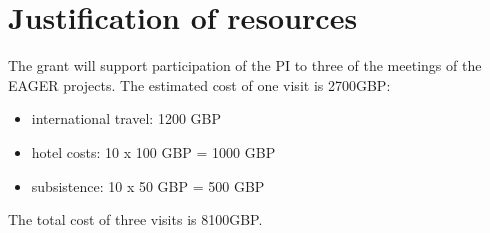 
\section{Justification of resources}
\label{annex:just}

The grant will support participation of the PI to three of the meetings of the EAGER projects.  The estimated cost of one visit is 2700GBP:

\begin{itemize}
\item international travel: 1200 GBP 
\item hotel costs: 10 x 100 GBP = 1000 GBP
\item subsistence: 10 x 50 GBP = 500 GBP 
\end{itemize}


The total cost of three visits is 8100GBP. 
